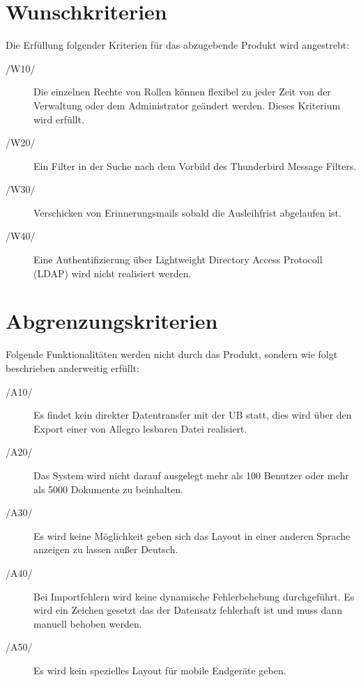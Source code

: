 \section{Wunschkriterien}
Die Erfüllung folgender Kriterien für das abzugebende Produkt wird angestrebt:
\begin{description}
  \item[/W10/] Die einzelnen Rechte von Rollen können flexibel zu jeder Zeit von der
Verwaltung oder dem Administrator geändert werden.
Dieses Kriterium wird erfüllt.
  \item[/W20/] Ein Filter in der Suche nach dem Vorbild des Thunderbird Message Filters.
  \item[/W30/] Verschicken von Erinnerungsmails sobald die Ausleihfrist abgelaufen ist.
  \item[/W40/] Eine Authentifizierung über Lightweight Directory Access Protocoll (LDAP)
wird nicht realisiert werden.
\end{description}

\section{Abgrenzungskriterien}
Folgende Funktionalitäten werden nicht durch das Produkt, sondern wie folgt
beschrieben anderweitig erfüllt:
\begin{description}
  \item[/A10/] Es findet kein direkter Datentransfer mit der UB statt, dies wird über
den Export einer von Allegro lesbaren Datei realisiert.
  \item[/A20/] Das System wird nicht darauf ausgelegt mehr als 100 Benutzer oder mehr
als 5000 Dokumente zu beinhalten.
  \item[/A30/] Es wird keine Möglichkeit geben sich das Layout in einer anderen Sprache
anzeigen zu lassen außer Deutsch.
  \item[/A40/] Bei Importfehlern wird keine dynamische Fehlerbehebung durchgeführt. Es
wird ein Zeichen gesetzt das der Datensatz fehlerhaft ist und muss dann manuell
behoben werden.
  \item[/A50/] Es wird kein spezielles Layout für mobile Endgeräte geben.
\end{description}
